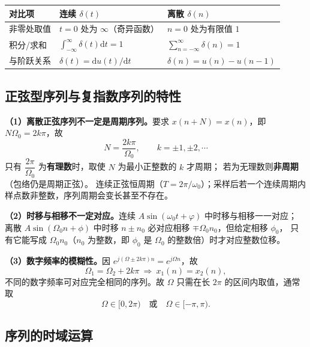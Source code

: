 \begin{center}
\begin{tabular}{lll}
\toprule
对比项 & 连续 $\delta(t)$ & 离散 $\delta(n)$ \\
\midrule
非零处取值 & $t=0$ 处为 $\infty$（奇异函数） & $n=0$ 处为有限值 $1$ \\
积分/求和 & $\int_{-\infty}^{\infty}\delta(t)\mathrm{d}t=1$ & $\sum_{n=-\infty}^{\infty}\delta(n)=1$ \\
与阶跃关系 & $\delta(t)=\mathrm{d}u(t)/\mathrm{d}t$ & $\delta(n)=u(n)-u(n-1)$ \\
\bottomrule
\end{tabular}
\end{center}

\subsection{正弦型序列与复指数序列的特性}

\textbf{（1）离散正弦序列不一定是周期序列。}要求 $x(n+N)=x(n)$，即 $N\Omega_0=2k\pi$，故
\begin{equation}
N=\frac{2k\pi}{\Omega_0},\qquad k=\pm1,\pm2,\cdots
\end{equation}
只有 $\dfrac{2\pi}{\Omega_0}$ 为\textbf{有理数}时，取使 $N$ 为最小正整数的 $k$ 才周期；
若为无理数则\textbf{非周期}（包络仍是周期正弦）。
连续正弦恒周期（$T=2\pi/\omega_0$）；采样后若一个连续周期内样点数非整数，序列周期会变长甚至不存在。

\textbf{（2）时移与相移不一定对应。}连续 $A\sin(\omega_0t+\varphi)$ 中时移与相移一一对应；
离散 $A\sin(\Omega_0n+\phi)$ 中时移 $n\pm n_0$ 必对应相移 $\mp\Omega_0n_0$，但给定相移 $\phi_0$，
只有它能写成 $\Omega_0n_0$（$n_0$ 为整数，即 $\phi_0$ 是 $\Omega_0$ 的整数倍）时才对应整数位移。

\textbf{（3）数字频率的模糊性。}因 $e^{j(\Omega\pm2k\pi)n}=e^{j\Omega n}$，故
\begin{equation}
\Omega_1=\Omega_2+2k\pi\ \Longrightarrow\ x_1(n)=x_2(n),
\end{equation}
不同的数字频率可对应完全相同的序列。故 $\Omega$ 只需在长 $2\pi$ 的区间内取值，通常取
\begin{equation}
\Omega\in[0,2\pi)\quad\text{或}\quad \Omega\in[-\pi,\pi).
\end{equation}

\subsection{序列的时域运算}

